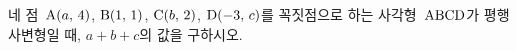 네 점~$\mathrm{A}(a,\,4)$, $\mathrm{B}(1,\,1)$, $\mathrm{C}(b,\,2)$, $\mathrm{D}(-3,\,c)$를 꼭짓점으로 하는 사각형~$\mathrm{ABCD}$가 평행사변형일 때, $a+b+c$의 값을 구하시오.
